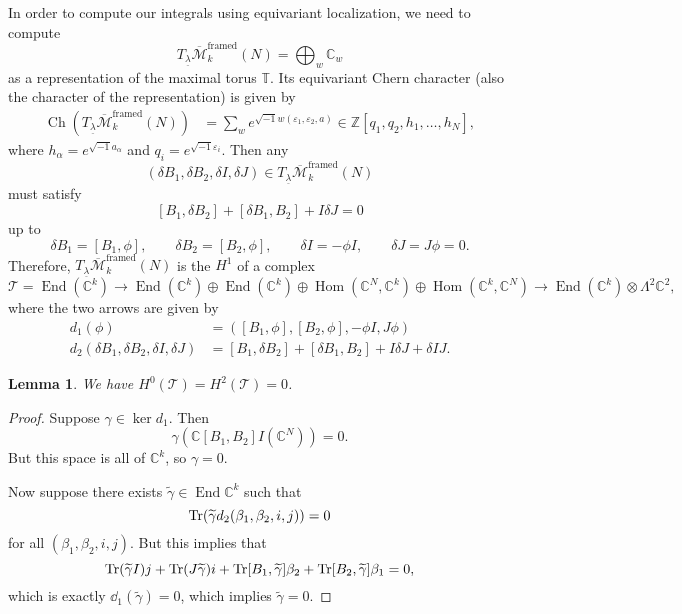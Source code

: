 \documentclass[leqno, openany]{memoir}
\newtheorem{lem}[thm]{Lemma}
\theoremstyle{definition}
\theoremstyle{remark}
\theoremstyle{plain}
\theoremstyle{definition}
\theoremstyle{remark}
\newcommand{\C}{\mathbb{C}}
\newcommand{\Z}{\mathbb{Z}}
\newcommand{\ep}{\varepsilon}
\newcommand{\mc}[1]{\mathcal{#1}}
\newcommand{\T}{\mathbb{T}}
\newcommand{\mr}[1]{\mathrm{#1}}
\newcommand{\on}[1]{\operatorname{#1}}
\newcommand{\ol}[1]{\overline{#1}}
\newcommand{\ul}[1]{\underline{#1}}
\newcommand{\wt}[1]{\widetilde{#1}}
\DeclareMathOperator{\Hom}{Hom}
\DeclareMathOperator{\End}{End}
\begin{document}
In order to compute our integrals using equivariant localization, we need to compute
\[ T_{\ul{\lambda}} \ol{\mc{M}}_k^{\mr{framed}}(N) = \bigoplus_w \C_w \]
as a representation of the maximal torus $\T$. Its equivariant Chern character (also the character of the representation) is given by
\begin{align*}
    \on{Ch}(T_{\ul{\lambda}} \ol{\mc{M}}_k^{\mr{framed}}(N)) &= \sum_w e^{\sqrt{-1} w(\ep_1, \ep_2, a)} \in \Z[q_1, q_2, h_1, \ldots, h_N], 
\end{align*}
where $h_{\alpha} = e^{\sqrt{-1} a_{\alpha}}$ and $q_i = e^{\sqrt{-1} \ep_i}$. Then any
\[ (\delta B_1, \delta B_2, \delta I, \delta J) \in T_{\ul{\lambda}} \ol{\mc{M}}_k^{\mr{framed}}(N) \]
must satisfy
\[ [B_1, \delta B_2] + [\delta B_1, B_2] + I \delta J = 0 \]
up to
\[ \delta B_1 = [B_1, \phi], \qquad \delta B_2 = [B_2, \phi], \qquad \delta I = - \phi I, \qquad \delta J = J \phi = 0. \]
Therefore, $T_{\ul{\lambda}} \ol{\mc{M}}_k^{\mr{framed}}(N)$ is the $H^1$ of a complex
\[ \mc{T} = \End(\C^k) \to \End(\C^k) \oplus \End(\C^k) \oplus \Hom(\C^N, \C^k) \oplus \Hom(\C^k, \C^N) \to \End(\C^k) \otimes \Lambda^2 \C^2, \]
where the two arrows are given by
\begin{align*}
    d_1(\phi) &= ([B_1, \phi], [B_2, \phi], -\phi I, J \phi) \\
    d_2(\delta B_1, \delta B_2, \delta I, \delta J) &= [B_1, \delta B_2] + [\delta B_1, B_2] + I \delta J + \delta I J.
\end{align*}

\begin{lem}
    We have $H^0(\mc{T}) = H^2(\mc{T}) = 0$.
\end{lem}

\begin{proof}
    Suppose $\gamma \in \ker d_1$. Then 
    \[ \gamma (\C[B_1, B_2] I(\C^N)) = 0. \]
    But this space is all of $\C^k$, so $\gamma = 0$.

    Now suppose there exists $\wt{\gamma} \in \End \C^k$ such that
    \[ \Tr (\wt{\gamma} d_2(\beta_1, \beta_2, i,j)) = 0 \]
    for all $(\beta_1, \beta_2, i, j)$. But this implies that
    \[ \Tr (\wt{\gamma} I)j + \Tr (J \wt{\gamma}) i + \Tr [B_1, \wt{\gamma}] \beta_2 + \Tr [B_2, \wt{\gamma}] \beta_1 = 0, \]
    which is exactly $\dd_1(\wt{\gamma}) = 0$, which implies $\wt{\gamma} = 0$.
\end{proof}
\end{document}
